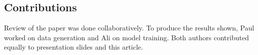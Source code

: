 \documentclass[a4paper,10pt,twocolumn]{article}
\begin{document}
        \subsection*{Contributions}
            Review of the paper was done collaboratively. 
            To produce the results shown, Paul worked on data generation and Ali on model training.
            Both authors contributed equally to presentation slides and this article.

    
    
    
\end{document}
